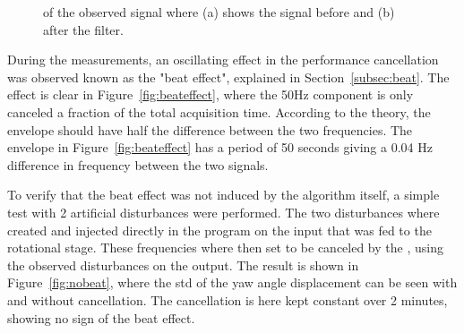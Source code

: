 \begin{figure}[h!]
  \centering %
  \qquad
  \caption{\label{fig:bandpass_imp} \abbrFFT of the observed signal where (a) shows the signal before and (b) after the filter.}
\end{figure}
\FloatBarrier
During the measurements, an oscillating effect in the performance cancellation was observed known as the "beat effect", explained in Section~\ref{subsec:beat}. The effect is clear in Figure~\ref{fig:beateffect}, where the 50Hz component is only canceled a fraction of the total acquisition time. According to the theory, the envelope should have half the difference between the two frequencies. The envelope in Figure~\ref{fig:beateffect} has a period of 50 seconds giving a 0.04 Hz difference in frequency between the two signals.

To verify that the beat effect was not induced by the algorithm itself, a simple test with 2 artificial disturbances were performed. The two disturbances where created and injected directly in the program on the input that was fed to the rotational stage. These frequencies where then set to be canceled by the \abbrRFDC, using the observed disturbances on the output. The result is shown in Figure~\ref{fig:nobeat}, where the std of the yaw angle displacement can be seen with and without cancellation.  The cancellation is here kept constant over 2 minutes, showing no sign of the beat effect.

